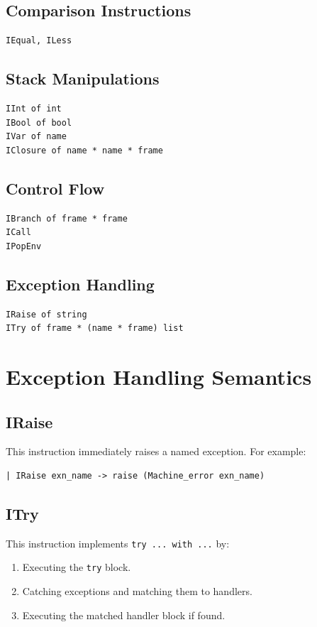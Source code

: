 \documentclass[11pt]{article}
\begin{document}
\subsection*{Comparison Instructions}
\begin{lstlisting}
IEqual, ILess
\end{lstlisting}

\subsection*{Stack Manipulations}
\begin{lstlisting}
IInt of int
IBool of bool
IVar of name
IClosure of name * name * frame
\end{lstlisting}

\subsection*{Control Flow}
\begin{lstlisting}
IBranch of frame * frame
ICall
IPopEnv
\end{lstlisting}

\subsection*{Exception Handling}
\begin{lstlisting}
IRaise of string
ITry of frame * (name * frame) list
\end{lstlisting}

\section{Exception Handling Semantics}
\subsection{IRaise}
This instruction immediately raises a named exception. For example:
\begin{lstlisting}
| IRaise exn_name -> raise (Machine_error exn_name)
\end{lstlisting}

\subsection{ITry}
This instruction implements \texttt{try ... with ...} by:
\begin{enumerate}
    \item Executing the \texttt{try} block.
    \item Catching exceptions and matching them to handlers.
    \item Executing the matched handler block if found.
\end{enumerate}
\end{document}
